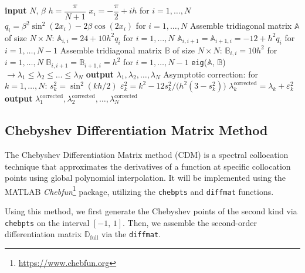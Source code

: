\documentclass[11pt,a4paper,oneside,openright]{report} %
\begin{document}
\begin{algorithm}[H]
\caption{Numerov's method - Coffey--Evans equation}
\label{alg_Numerov_CE}
{\small
\begin{algorithmic}[1]
\State \textbf{input} $N$, $\beta$
\State $h = \dfrac{\pi}{N + 1}$
\State $x_i = -\dfrac{\pi}{2} + i h$ \quad for $i = 1, \dots,N$
\State $q_i = \beta^2 \sin^2(2 x_i) - 2 \beta \cos(2 x_i)$ \quad for $i = 1, \dots, N$
\BlankLine
\State Assemble tridiagonal matrix $\mathbb{A}$ of size $N \times N$:
\State \quad $\mathbb{A}_{i,i} = 24 + 10 h^2 q_i$ \quad for $i = 1, \dots,N$
\State \quad $\mathbb{A}_{i,i+1} = \mathbb{A}_{i+1,i} = - 12 + h^2 q_i$ \quad for $i = 1, \dots,N-1$
\BlankLine
\State Assemble tridiagonal matrix $\mathbb{B}$ of size $N \times N$:
\State \quad $\mathbb{B}_{i,i} = 10 h^2$ \quad for $i = 1, \dots,N$
\State \quad $\mathbb{B}_{i,i+1} = \mathbb{B}_{i+1,i} = h^2$ \quad for $i = 1, \dots,N-1$
\BlankLine
\State \texttt{eig}($\mathbb{A}$, $\mathbb{B}$) $ \to \lambda_1 \leq \lambda_2 \leq \dots \leq \lambda_N$
\State \textbf{output} $\lambda_1, \lambda_2, \dots, \lambda_N$
\BlankLine
\State Asymptotic correction:
\State \quad for $k = 1, \dots,N$:
\State \quad \quad $s_k^2 = \sin^2(k h / 2)$
\State \quad \quad $\varepsilon_k^2 = k^2 - 12 s_k^2 / \big(h^2 (3 - s_k^2) \big)$
\State \quad \quad $\lambda_k^{\text{corrected}} = \lambda_k + \varepsilon_k^2$
\State \textbf{output} $\lambda_1^{\text{corrected}}, \lambda_2^{\text{corrected}}, \dots , \lambda_N^{\text{corrected}}$
\end{algorithmic}
}
\end{algorithm}



\subsection{Chebyshev Differentiation Matrix Method}
\noindent
The Chebyshev Differentiation Matrix method (CDM) is a spectral collocation technique that approximates the derivatives of a function at specific collocation points using global polynomial interpolation. It will be implemented using the MATLAB \textit{Chebfun}\footnote{\url{https://www.chebfun.org}} package, utilizing the \texttt{chebpts} and \texttt{diffmat} functions.

Using this method, we first generate the Chebyshev points of the second kind via \texttt{chebpts} on the interval $[-1,  \, 1]$. Then, we assemble the second-order differentiation matrix $\mathbb{D}_{\text{full}}$ via the \texttt{diffmat}.
\end{document}
